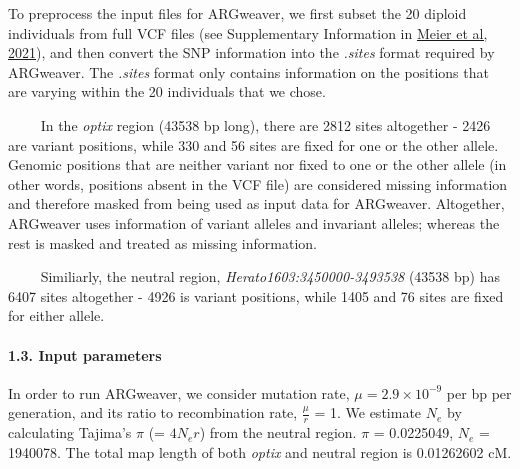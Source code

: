 \documentclass[
]{article}
\begin{document}
\hfill\break
To preprocess the input files for ARGweaver, we first subset the 20
diploid individuals from full VCF files (see Supplementary Information
in \href{https://www.pnas.org/doi/10.1073/pnas.2015005118}{Meier et al,
2021}), and then convert the SNP information into the \emph{.sites}
format required by ARGweaver. The \emph{.sites} format only contains
information on the positions that are varying within the 20 individuals
that we chose.

   In the \emph{optix} region (43538 bp long), there are 2812 sites
altogether - 2426 are variant positions, while 330 and 56 sites are
fixed for one or the other allele. Genomic positions that are neither
variant nor fixed to one or the other allele (in other words, positions
absent in the VCF file) are considered missing information and therefore
masked from being used as input data for ARGweaver. Altogether,
ARGweaver uses information of variant alleles and invariant alleles;
whereas the rest is masked and treated as missing information.

   Similiarly, the neutral region, \emph{Herato1603:3450000-3493538}
(43538 bp) has 6407 sites altogether - 4926 is variant positions, while
1405 and 76 sites are fixed for either allele.

\hypertarget{input-parameters}{%
\paragraph{\texorpdfstring{1.3. Input parameters\\
}{1.3. Input parameters }}\label{input-parameters}}

\hfill\break
In order to run ARGweaver, we consider mutation rate,
\(\mu = 2.9 \times 10^{-9}\) per bp per generation, and its ratio to
recombination rate, \(\frac{\mu}{r}\) = 1. We estimate \(N_e\) by
calculating Tajima's \(\pi\) (= \(4N_e r\)) from the neutral region.
\(\pi\) = 0.0225049, \(N_e\) = 1940078. The total map length of both
\emph{optix} and neutral region is 0.01262602 cM.\\
\end{document}

